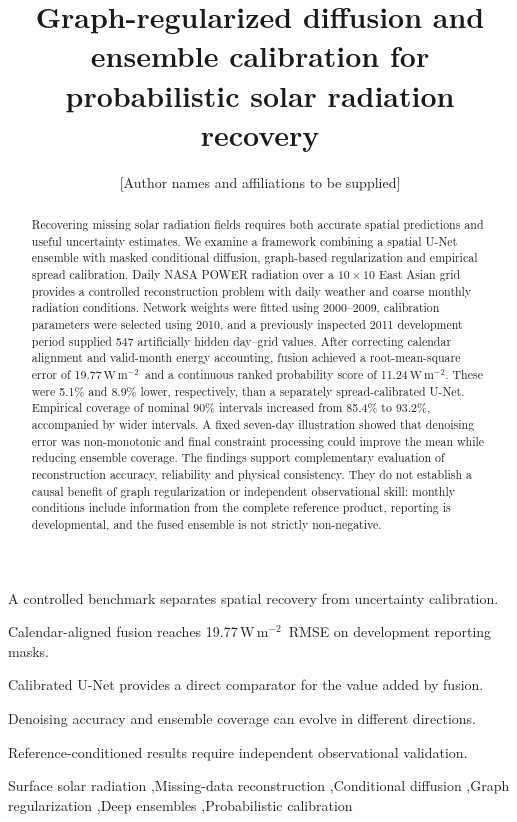 \documentclass[preprint,12pt,authoryear]{elsarticle}
\newcommand{\wm}{\ensuremath{\mathrm{W\,m^{-2}}}}
\begin{document}
\begin{frontmatter}
\title{Graph-regularized diffusion and ensemble calibration for probabilistic solar radiation recovery}
\author{[Author names and affiliations to be supplied]}
\begin{abstract}
Recovering missing solar radiation fields requires both accurate spatial predictions and useful uncertainty estimates. We examine a framework combining a spatial U-Net ensemble with masked conditional diffusion, graph-based regularization and empirical spread calibration. Daily NASA POWER radiation over a $10\times10$ East Asian grid provides a controlled reconstruction problem with daily weather and coarse monthly radiation conditions. Network weights were fitted using 2000--2009, calibration parameters were selected using 2010, and a previously inspected 2011 development period supplied 547 artificially hidden day--grid values. After correcting calendar alignment and valid-month energy accounting, fusion achieved a root-mean-square error of 19.77\,\wm\ and a continuous ranked probability score of 11.24\,\wm. These were 5.1\% and 8.9\% lower, respectively, than a separately spread-calibrated U-Net. Empirical coverage of nominal 90\% intervals increased from 85.4\% to 93.2\%, accompanied by wider intervals. A fixed seven-day illustration showed that denoising error was non-monotonic and final constraint processing could improve the mean while reducing ensemble coverage. The findings support complementary evaluation of reconstruction accuracy, reliability and physical consistency. They do not establish a causal benefit of graph regularization or independent observational skill: monthly conditions include information from the complete reference product, reporting is developmental, and the fused ensemble is not strictly non-negative.
\end{abstract}
\begin{highlights}
\item A controlled benchmark separates spatial recovery from uncertainty calibration.
\item Calendar-aligned fusion reaches 19.77\,\wm\ RMSE on development reporting masks.
\item Calibrated U-Net provides a direct comparator for the value added by fusion.
\item Denoising accuracy and ensemble coverage can evolve in different directions.
\item Reference-conditioned results require independent observational validation.
\end{highlights}
\begin{keyword}
Surface solar radiation \sep Missing-data reconstruction \sep Conditional diffusion \sep Graph regularization \sep Deep ensembles \sep Probabilistic calibration
\end{keyword}
\end{frontmatter}
\end{document}
